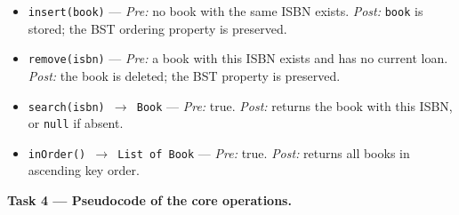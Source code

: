 \documentclass[11pt]{article}
\begin{document}
\begin{exemplebox}
\begin{itemize}
\item \texttt{insert(book)} — \emph{Pre:} no book with the same ISBN exists. \emph{Post:} \texttt{book} is stored; the BST ordering property is preserved.
\item \texttt{remove(isbn)} — \emph{Pre:} a book with this ISBN exists and has no current loan. \emph{Post:} the book is deleted; the BST property is preserved.
\item \texttt{search(isbn) $\rightarrow$ Book} — \emph{Pre:} true. \emph{Post:} returns the book with this ISBN, or \texttt{null} if absent.
\item \texttt{inOrder() $\rightarrow$ List of Book} — \emph{Pre:} true. \emph{Post:} returns all books in ascending key order.
\end{itemize}
\end{exemplebox}

\textbf{Task 4 — Pseudocode of the core operations.}
\end{document}
